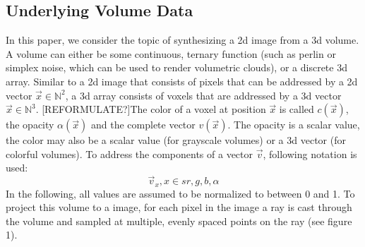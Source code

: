 \subsection{Underlying Volume Data}
In this paper, we consider the topic of synthesizing a 2d image from a 3d volume.
A volume can either be some continuous, ternary function (such as perlin or simplex noise\cite{10.1145/325165.325247}, which can be used to render volumetric clouds\cite{haggstrom2018real}), or a discrete 3d array\cite{511}.
Similar to a 2d image that consists of pixels that can be addressed by a 2d vector $\vec{x} \in \mathbb{N}^2$, a 3d array consists of voxels that are addressed by a 3d vector $\vec{x} \in \mathbb{N}^3$. [REFORMULATE?]The color of a voxel at position $\vec{x}$ is called $c(\vec{x})$, the opacity $\alpha(\vec{x})$ and the complete vector $v(\vec{x})$. The opacity is a scalar value, the color may also be a scalar value (for grayscale volumes) or a 3d vector (for colorful volumes).
To address the components of a vector $\vec{v}$, following notation is used:
\begin{equation}
	\vec{v}_{x}, x \in s{r, g, b, \alpha}
\end{equation}
 In the following, all values are assumed to be normalized to between 0 and 1. To project this volume to a image, for each pixel in the image a ray is cast through the volume and sampled at multiple, evenly spaced points on the ray (see figure 1)\cite{10.1145/78964.78965}.


